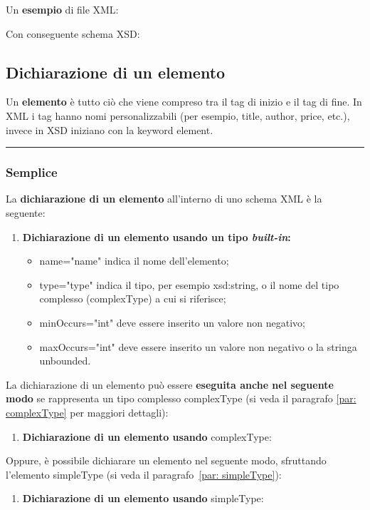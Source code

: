 \documentclass[a4paper]{article}
\newcommand{\longline}{\noindent\rule{\textwidth}{0.4pt}}
\begin{document}
	\noindent
	Un \textcolor{Green4}{\textbf{esempio}} di file XML:
	
	Con conseguente schema XSD:
	\newpage
	
	\subsection{Dichiarazione di un elemento}
	
	Un \textcolor{Red3}{\textbf{elemento}} è tutto ciò che viene compreso tra il tag di inizio e il tag di fine. In XML i tag hanno nomi personalizzabili (per esempio, title, author, price, etc.), invece in XSD iniziano con la keyword \textsf{element}.
	
	\longline
	
	\subsubsection{Semplice}

	La \textbf{dichiarazione di un elemento} all'interno di uno schema XML è la seguente:
	\begin{enumerate}
		\item \textcolor{Red3}{\textbf{Dichiarazione di un elemento usando un tipo \emph{built-in}:}}
		
		\begin{itemize}
			\item \textsf{name="name"} indica il nome dell'elemento;
			
			\item \textsf{type="type"} indica il tipo, per esempio \textsf{xsd:string}, o il nome del tipo complesso (\textsf{complexType}) a cui si riferisce;
			
			\item \textsf{minOccurs="int"} deve essere inserito un valore non negativo;
			
			\item \textsf{maxOccurs="int"} deve essere inserito un valore non negativo o la stringa \textsf{unbounded}.
		\end{itemize}
	\end{enumerate}
	La dichiarazione di un elemento può essere \textbf{eseguita anche nel seguente modo} se rappresenta un tipo complesso \textsf{complexType} (si veda il paragrafo \ref{par: complexType} per maggiori dettagli):
	\begin{enumerate}[resume]
		\item \textcolor{Red3}{\textbf{Dichiarazione di un elemento usando} \textsf{complexType}:}
		
	\end{enumerate}
	Oppure, è possibile dichiarare un elemento nel seguente modo, sfruttando l'elemento \textsf{simpleType} (si veda il paragrafo~\ref{par: simpleType}):
	\begin{enumerate}[resume]
		\item \textcolor{Red3}{\textbf{Dichiarazione di un elemento usando} \textsf{simpleType}:}
		
	\end{enumerate}\newpage
	
\end{document}
